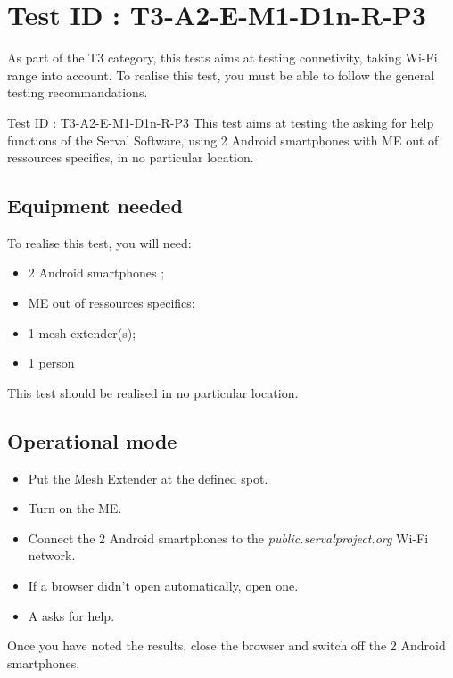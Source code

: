 \documentclass[oneside]{book}
\begin{document}
\section{Test ID : T3-A2-E-M1-D1n-R-P3}
\begin{itshape}
As part of the T3 category, this tests aims at testing connetivity, taking Wi-Fi range into account.
To realise this test, you must be able to follow the general testing recommandations.
\end{itshape}
\newline
Test ID : T3-A2-E-M1-D1n-R-P3
 This test aims at testing the asking for help functions of the Serval Software, using 2 Android smartphones with ME out of ressources specifics, in no particular location.
\subsection{Equipment needed} To realise this test, you will need:
\begin{itemize}
\item 2 Android smartphones ;
\item ME out of ressources specifics;
\item 1 mesh extender(s);
\item 1 person
\end{itemize}
This test should be realised in no particular location.
\subsection{Operational mode} \begin{itemize}
\item Put the Mesh Extender at the defined spot.
\item Turn on the ME.
\item Connect the 2 Android smartphones to the \emph{public.servalproject.org} Wi-Fi network.
\item If a browser didn't open automatically, open one.
\item A asks for help.
\end{itemize}
Once you have noted the results, close the browser and switch off the 2 Android smartphones.
\end{document}
